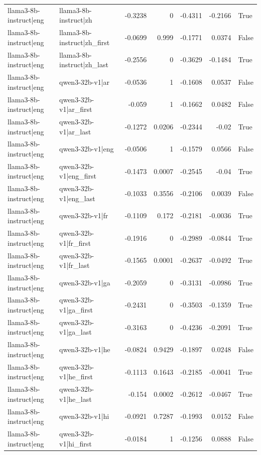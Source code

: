 \begin{table}
\begin{tabular}{l l r r r r l}
llama3-8b-instruct|eng & llama3-8b-instruct|zh & -0.3238 & 0 & -0.4311 & -0.2166 & True \\
llama3-8b-instruct|eng & llama3-8b-instruct|zh_first & -0.0699 & 0.999 & -0.1771 & 0.0374 & False \\
llama3-8b-instruct|eng & llama3-8b-instruct|zh_last & -0.2556 & 0 & -0.3629 & -0.1484 & True \\
llama3-8b-instruct|eng & qwen3-32b-v1|ar & -0.0536 & 1 & -0.1608 & 0.0537 & False \\
llama3-8b-instruct|eng & qwen3-32b-v1|ar_first & -0.059 & 1 & -0.1662 & 0.0482 & False \\
llama3-8b-instruct|eng & qwen3-32b-v1|ar_last & -0.1272 & 0.0206 & -0.2344 & -0.02 & True \\
llama3-8b-instruct|eng & qwen3-32b-v1|eng & -0.0506 & 1 & -0.1579 & 0.0566 & False \\
llama3-8b-instruct|eng & qwen3-32b-v1|eng_first & -0.1473 & 0.0007 & -0.2545 & -0.04 & True \\
llama3-8b-instruct|eng & qwen3-32b-v1|eng_last & -0.1033 & 0.3556 & -0.2106 & 0.0039 & False \\
llama3-8b-instruct|eng & qwen3-32b-v1|fr & -0.1109 & 0.172 & -0.2181 & -0.0036 & True \\
llama3-8b-instruct|eng & qwen3-32b-v1|fr_first & -0.1916 & 0 & -0.2989 & -0.0844 & True \\
llama3-8b-instruct|eng & qwen3-32b-v1|fr_last & -0.1565 & 0.0001 & -0.2637 & -0.0492 & True \\
llama3-8b-instruct|eng & qwen3-32b-v1|ga & -0.2059 & 0 & -0.3131 & -0.0986 & True \\
llama3-8b-instruct|eng & qwen3-32b-v1|ga_first & -0.2431 & 0 & -0.3503 & -0.1359 & True \\
llama3-8b-instruct|eng & qwen3-32b-v1|ga_last & -0.3163 & 0 & -0.4236 & -0.2091 & True \\
llama3-8b-instruct|eng & qwen3-32b-v1|he & -0.0824 & 0.9429 & -0.1897 & 0.0248 & False \\
llama3-8b-instruct|eng & qwen3-32b-v1|he_first & -0.1113 & 0.1643 & -0.2185 & -0.0041 & True \\
llama3-8b-instruct|eng & qwen3-32b-v1|he_last & -0.154 & 0.0002 & -0.2612 & -0.0467 & True \\
llama3-8b-instruct|eng & qwen3-32b-v1|hi & -0.0921 & 0.7287 & -0.1993 & 0.0152 & False \\
llama3-8b-instruct|eng & qwen3-32b-v1|hi_first & -0.0184 & 1 & -0.1256 & 0.0888 & False \\

\end{tabular}
\end{table}
